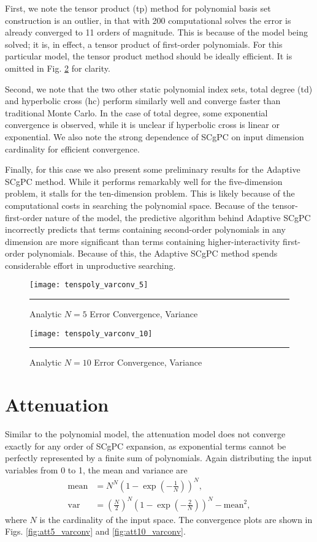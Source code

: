 First, we note the tensor product (tp) method for polynomial basis set construction is an outlier, in that
with 200 computational solves the error is already converged to 11 orders of magnitude.  This is because of
the model being solved; it is, in effect, a tensor product of first-order polynomials.  For this particular
model, the tensor product method should be ideally efficient.  It is omitted in Fig.
\ref{fig:anl10_varconv} for clarity.

Second, we note that the two other static polynomial index sets, total degree (td) and hyperbolic cross (hc)
perform similarly well and converge faster than traditional Monte Carlo.  In the case of total degree, some
exponential convergence is observed, while it is unclear if hyperbolic cross is linear or exponential.  We
also note the strong dependence of SCgPC on input dimension cardinality for efficient convergence.

Finally, for this case we
also present some preliminary results for the Adaptive SCgPC method.  While it performs remarkably well for
the five-dimension problem, it stalls for the ten-dimension problem.  This is likely because of the
computational costs in searching the polynomial space.  Because of the tensor-first-order nature of the model,
the predictive algorithm behind Adaptive SCgPC incorrectly predicts that terms containing second-order
polynomials in any dimension are more significant than terms containing higher-interactivity first-order
polynomials.  Because of this, the Adaptive SCgPC method spends considerable effort in unproductive searching.

\begin{figure}[H]
  \centering
    \texttt{[image: tenspoly\_varconv\_5]}
    \rule{35em}{0.5pt}
  \caption{Analytic $N=5$ Error Convergence, Variance}
  \label{fig:anl5_varconv}
\end{figure}
\begin{figure}[H]
  \centering
    \texttt{[image: tenspoly\_varconv\_10]}
    \rule{35em}{0.5pt}
  \caption{Analytic $N=10$ Error Convergence, Variance}
  \label{fig:anl10_varconv}
\end{figure}



\section{Attenuation}
Similar to the polynomial model, the attenuation model does not converge exactly for any order of SCgPC
expansion, as exponential terms cannot be perfectly represented by a finite sum of polynomials.
Again distributing the input variables from 0 to 1, the mean and variance are
\begin{align}
  \text{mean}&=N^N\left(1-\exp(-\frac{1}{N})\right)^N,\\
  \text{var}&=\left(\frac{N}{2}\right)^N \left(1-\exp(-\frac{2}{N})\right)^N - \text{mean}^2,
\end{align}
where $N$ is the cardinality of the input space.  The convergence plots are shown in Figs.
\ref{fig:att5_varconv} and \ref{fig:att10_varconv}.

